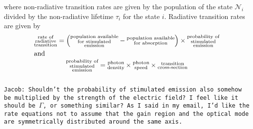 \documentclass[12pt]{report}
\begin{document}
where non-radiative transition rates are given by the population of the state $\mathcal{N}_i$ divided by the non-radiative lifetime $\tau_i$ for the state $i$.  Radiative transition rates are given by
\begin{gather*}
\begin{subarray}{c}\textnormal{rate of}\\\textnormal{radiative}\\\textnormal{transition}\end{subarray} = \left( \begin{subarray}{c}\textnormal{population available}\\\textnormal{for stimulated}\\\textnormal{emission}\end{subarray} - \begin{subarray}{c}\textnormal{population available}\\\textnormal{for absorption}\end{subarray}\right) \times \begin{subarray}{c}\textnormal{probability of}\\\textnormal{stimulated}\\\textnormal{emission}\end{subarray}\\
\intertext{and}
\begin{subarray}{c}\textnormal{probability of}\\\textnormal{stimulated}\\\textnormal{emission}\end{subarray} = \begin{subarray}{c}\textnormal{photon}\\\textnormal{density}\end{subarray} \times \begin{subarray}{c}\textnormal{photon}\\\textnormal{speed}\end{subarray} \times \begin{subarray}{c}\textnormal{transition}\\\textnormal{cross-section}\end{subarray}
\end{gather*}
\\
\texttt{Jacob: Shouldn't the probability of stimulated emission also somehow be multiplied by the strength of the electric field?  I feel like it should be $\Gamma$, or something similar? As I said in my email, I'd like the rate equations not to assume that the gain region and the optical mode are symmetrically distributed around the same axis.}
\\
\end{document}
